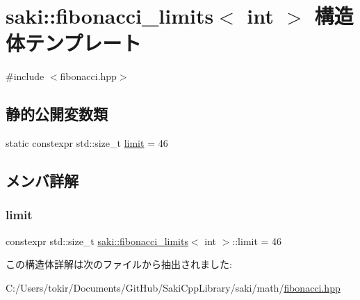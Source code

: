\hypertarget{structsaki_1_1fibonacci__limits_3_01int_01_4}{}\section{saki\+:\+:fibonacci\+\_\+limits$<$ int $>$ 構造体テンプレート}
\label{structsaki_1_1fibonacci__limits_3_01int_01_4}


{\ttfamily \#include $<$fibonacci.\+hpp$>$}

\subsection*{静的公開変数類}
\begin{DoxyCompactItemize}
\item 
static constexpr std\+::size\+\_\+t \mbox{\hyperlink{structsaki_1_1fibonacci__limits_3_01int_01_4_a3eb60af447ff003386111e3056acb693}{limit}} = 46
\end{DoxyCompactItemize}


\subsection{メンバ詳解}
\mbox{\label{structsaki_1_1fibonacci__limits_3_01int_01_4_a3eb60af447ff003386111e3056acb693}} 
\subsubsection{\texorpdfstring{limit}{limit}}
{\footnotesize\ttfamily constexpr std\+::size\+\_\+t \mbox{\hyperlink{structsaki_1_1fibonacci__limits}{saki\+::fibonacci\+\_\+limits}}$<$ int $>$\+::limit = 46\hspace{0.3cm}{\ttfamily [static]}}



この構造体詳解は次のファイルから抽出されました\+:\begin{DoxyCompactItemize}
\item 
C\+:/\+Users/tokir/\+Documents/\+Git\+Hub/\+Saki\+Cpp\+Library/saki/math/\mbox{\hyperlink{fibonacci_8hpp}{fibonacci.\+hpp}}\end{DoxyCompactItemize}
